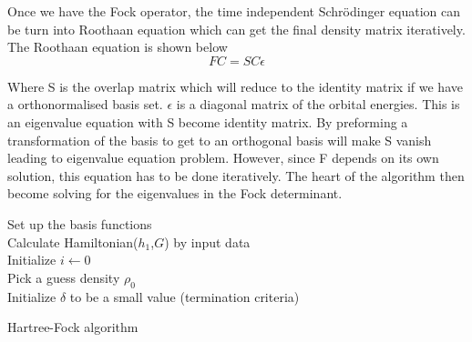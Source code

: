 \documentclass[twoside]{article}
\begin{document}
Once we have the Fock operator, the time independent Schrödinger equation
can be turn into Roothaan equation which can get the final density matrix iteratively.
The Roothaan equation is shown below
\[
FC = SC\epsilon
\]



Where S is the overlap matrix which will reduce to the identity matrix if we have a orthonormalised basis set. $\epsilon$ is a diagonal matrix of the orbital energies. This is an eigenvalue equation with S become identity matrix. By preforming a transformation of the basis to get to an orthogonal basis will make S vanish leading to eigenvalue equation problem. However, since F depends on its own solution, this equation has to be done iteratively. The heart of the algorithm then become solving for the eigenvalues in the Fock determinant.\\




\begin{algorithm}[htb]
	Set up the basis functions\\
	Calculate Hamiltonian($h_1$,$G$) by input data  \\
	Initialize $i \leftarrow	 0$ \\	
	Pick a guess density $\rho_0$ \\
	Initialize $\delta$ to be a small value (termination criteria) \\
 \caption{Hartree-Fock algorithm}
\end{algorithm}
 

\end{document}

